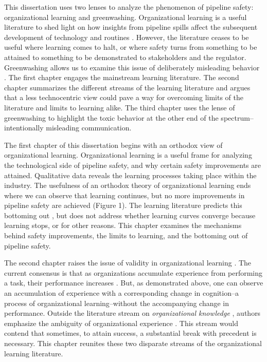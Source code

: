 This dissertation uses two lenses to analyze the phenomenon of pipeline safety: organizational learning and greenwashing. Organizational learning is a useful literature to shed light on how insights from pipeline spills affect the subsequent development of technology and routines \citep{Maslach2018}. However, the literature ceases to be useful where learning comes to halt, or where safety turns from something to be attained to something to be demonstrated to stakeholders and the regulator. Greenwashing allows us to examine this issue of deliberately misleading behavior \citep{Lyon2015}. The first chapter engages the mainstream learning literature. The second chapter summarizes the different streams of the learning literature and argues that a less technocentric view could pave a way for overcoming limits of the literature and limits to learning alike. The third chapter uses the lense of greenwashing to highlight the toxic behavior at the other end of the spectrum--intentionally misleading communication.

The first chapter of this dissertation begins with an orthodox view of organizational learning. Organizational learning is a useful frame for analyzing the technological side of pipeline safety, and why certain safety improvements are attained. Qualitative data reveals the learning processes taking place within the industry. The usefulness of an orthodox theory of organizational learning ends where we can observe that learning continues, but no more improvements in pipeline safety are achieved (Figure 1). The learning literature predicts this bottoming out \citep{Argote2013-1}, but does not address whether learning curves converge because learning stops, or for other reasons. This chapter examines the mechanisms behind safety improvements, the limits to learning, and the bottoming out of pipeline safety.

The second chapter raises the issue of validity in organizational learning \citep{Rerup2020}. The current consensus is that as organizations accumulate experience from performing a task, their performance increases \citep{Argote2011}. But, as demonstrated above, one can observe an accumulation of experience with a corresponding change in cognition--a process of organizational learning--without the accompanying change in performance. Outside the literature stream on \textit{organizational knowledge} \citep{Bingham2011}, authors emphasize the ambiguity of organizational experience \citep{March2010}. This stream would contend that sometimes, to attain success, a substantial break with precedent is necessary. This chapter reunites these two disparate streams of the organizational learning literature.

